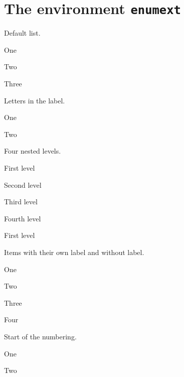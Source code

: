 \documentclass{article}
\begin{document}
\section{The environment \texttt{enumext}}

Default list.

\begin{enumext}
  \item One
  \item Two
  \item Three
\end{enumext}

Letters in the label.

\begin{enumext}[label=\alph*)]
  \item One
  \item Two
\end{enumext}

Four nested levels.

\begin{enumext}
  \item First level
    \begin{enumext}
      \item Second level
        \begin{enumext}
          \item Third level
            \begin{enumext}
              \item Fourth level
            \end{enumext}
        \end{enumext}
    \end{enumext}
  \item First level
\end{enumext}

Items with their own label and without label.

\begin{enumext}
  \item One
  \item[X] Two
  \item* Three
  \item Four
\end{enumext}

Start of the numbering.

\begin{enumext}[start=5]
  \item One
  \item Two
\end{enumext}
\end{document}
